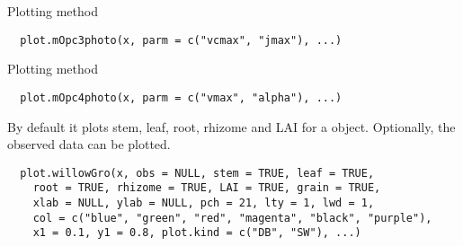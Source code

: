 \documentclass[letterpaper]{book}
\begin{document}
%
\begin{Description}\relax
Plotting method
\end{Description}
%
\begin{Usage}
\begin{verbatim}
  plot.mOpc3photo(x, parm = c("vcmax", "jmax"), ...)
\end{verbatim}
\end{Usage}
%
\begin{Description}\relax
Plotting method
\end{Description}
%
\begin{Usage}
\begin{verbatim}
  plot.mOpc4photo(x, parm = c("vmax", "alpha"), ...)
\end{verbatim}
\end{Usage}
%
\begin{Description}\relax
By default it plots stem, leaf, root, rhizome and LAI for
a  object. Optionally, the observed data
can be plotted.
\end{Description}
%
\begin{Usage}
\begin{verbatim}
  plot.willowGro(x, obs = NULL, stem = TRUE, leaf = TRUE,
    root = TRUE, rhizome = TRUE, LAI = TRUE, grain = TRUE,
    xlab = NULL, ylab = NULL, pch = 21, lty = 1, lwd = 1,
    col = c("blue", "green", "red", "magenta", "black", "purple"),
    x1 = 0.1, y1 = 0.8, plot.kind = c("DB", "SW"), ...)
\end{verbatim}
\end{Usage}
%
\end{document}

